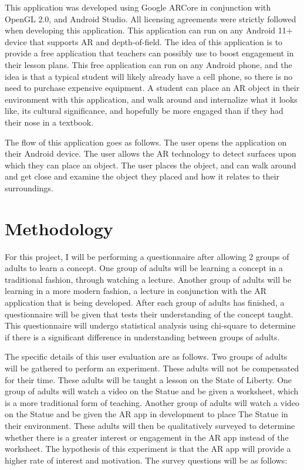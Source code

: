 \documentclass{vgtc}                          %
\begin{document}
This application was developed using Google ARCore in conjunction with OpenGL 2.0, and Android Studio. All licensing agreements were strictly followed when developing this application. This application can run on any Android 11+ device that supports AR and depth-of-field. The idea of this application is to provide a free application that teachers can possibly use to boost engagement in their lesson plans. This free application can run on any Android phone, and the idea is that a typical student will likely already have a cell phone, so there is no need to purchase expensive equipment. A student can place an AR object in their environment with this application, and walk around and internalize what it looks like, its cultural significance, and hopefully be more engaged than if they had their nose in a textbook. 
\vspace*{4mm}

The flow of this application goes as follows. The user opens the application on their Android device. The user allows the AR technology to detect surfaces upon which they can place an object. The user places the object, and can walk around and get close and examine the object they placed and how it relates to their surroundings. 

\section{Methodology}

For this project, I will be performing a questionnaire after allowing 2 groups of adults to learn a concept. One group of adults will be learning a concept in a traditional fashion, through watching a lecture. Another group of adults will be learning in a more modern fashion, a lecture in conjunction with the AR application that is being developed. After each group of adults has finished, a questionnaire will be given that tests their understanding of the concept taught. This questionnaire will undergo statistical analysis using chi-square to determine if there is a significant difference in understanding between groups of adults. 
\vspace*{4mm}

	The specific details of this user evaluation are as follows. Two groups of adults will be gathered to perform an experiment. These adults will not be compensated for their time. These adults will be taught a lesson on the State of Liberty. One group of adults will watch a video on the Statue and be given a worksheet, which is a more traditional form of teaching. Another group of adults will watch a video on the Statue and be given the AR app in development to place The Statue in their environment. These adults will then be qualitatively surveyed to determine whether there is a greater interest or engagement in the AR app instead of the worksheet. The hypothesis of this experiment is that the AR app will provide a higher rate of interest and motivation. The survey questions will be as follows:
\vspace*{4mm}
\end{document}

